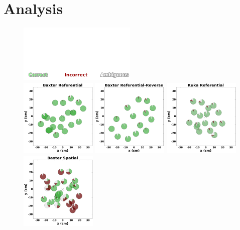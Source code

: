 \section{Analysis}
\label{analysis}

\begin{figure}[ht!]

    \centering
    \includegraphics[width=0.5\textwidth, trim={0 0 0 3.3in},clip ] {figures/labels.png}\\
    \includegraphics[width=0.325\textwidth ] {figures/baxter_Referential_.png}
    \includegraphics[width=0.325\textwidth ] {figures/baxter_Referential-Reverse_.png}
    \includegraphics[width=0.325\textwidth ]{figures/kuka_Referential_.png}
    \includegraphics[width=0.325\textwidth ]{figures/baxter_Spatial_.png}

\end{figure}
